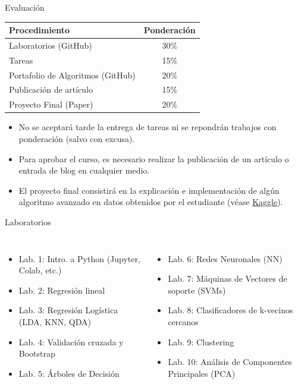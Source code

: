 \documentclass[usenames,dvipsnames]{beamer} %
\begin{document}
\begin{frame}{Evaluaci\'on}
    \begin{table}[bt]
\begin{tabular}{|l|c|} \hline
\textbf{Procedimiento} & \textbf{Ponderaci\'on} \\ \hline
Laboratorios (GitHub) & 30\% \\
Tareas & 15\% \\
Portafolio de Algoritmos (GitHub) & 20\%\\ 
Publicaci\'on de art\'iculo & 15\%\\
Proyecto Final (Paper) & 20\%\\ 
\hline
\end{tabular}
\end{table}

\begin{itemize}
    \item No se aceptar\'a tarde la entrega de tareas ni se repondr\'an trabajos con ponderaci\'on (salvo con excusa).
    \item Para aprobar el curso, es necesario realizar la publicaci\'on de un art\'iculo o entrada de blog en cualquier medio.
    \item El proyecto final consistir\'a en la explicaci\'on e implementaci\'on de alg\'un algoritmo avanzado en datos obtenidos por el estudiante (v\'ease \href{https://www.kaggle.com/datasets}{Kaggle}).
\end{itemize}

\end{frame}

\begin{frame}{Laboratorios}
    \begin{columns}
    \begin{itemize}
        \item Lab. 1: Intro. a Python (Jupyter, Colab, etc.)
        \item Lab. 2: Regresi\'on lineal
        \item Lab. 3: Regresi\'on Log\'istica (LDA, KNN, QDA)
        \item Lab. 4: Validaci\'on cruzada y Bootstrap
        \item Lab. 5: \'Arboles de Decisi\'on
    \end{itemize}
    \begin{itemize}
        \item Lab. 6: Redes Neuronales (NN)
        \item Lab. 7: M\'aquinas de Vectores de soporte (SVMs)
        \item Lab. 8: Clasificadores de k-vecinos cercanos
        \item Lab. 9: Clustering
        \item Lab. 10: An\'alisis de Componentes Principales (PCA)
    \end{itemize}
    \end{columns}
\end{frame}
\end{document}
